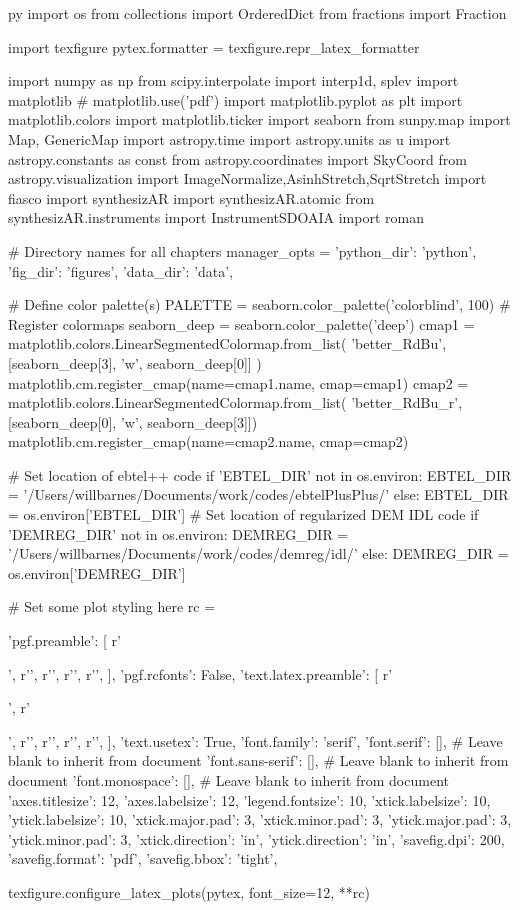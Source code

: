 \begin{pythontexcustomcode}{py}
import os
from collections import OrderedDict
from fractions import Fraction

import texfigure
pytex.formatter = texfigure.repr_latex_formatter

import numpy as np
from scipy.interpolate import interp1d, splev
import matplotlib
# matplotlib.use('pdf')
import matplotlib.pyplot as plt
import matplotlib.colors
import matplotlib.ticker
import seaborn
from sunpy.map import Map, GenericMap
import astropy.time
import astropy.units as u
import astropy.constants as const
from astropy.coordinates import SkyCoord
from astropy.visualization import ImageNormalize,AsinhStretch,SqrtStretch
import fiasco
import synthesizAR
import synthesizAR.atomic
from synthesizAR.instruments import InstrumentSDOAIA
import roman

# Directory names for all chapters
manager_opts = {'python_dir': 'python', 'fig_dir': 'figures', 'data_dir': 'data',}

# Define color palette(s)
PALETTE = seaborn.color_palette('colorblind', 100)
#  Register colormaps
seaborn_deep = seaborn.color_palette('deep')
cmap1 = matplotlib.colors.LinearSegmentedColormap.from_list(
    'better_RdBu', [seaborn_deep[3], 'w', seaborn_deep[0]]
)
matplotlib.cm.register_cmap(name=cmap1.name, cmap=cmap1)
cmap2 = matplotlib.colors.LinearSegmentedColormap.from_list(
    'better_RdBu_r', [seaborn_deep[0], 'w', seaborn_deep[3]])
matplotlib.cm.register_cmap(name=cmap2.name, cmap=cmap2)

# Set location of ebtel++ code
if 'EBTEL_DIR' not in os.environ:
	EBTEL_DIR = '/Users/willbarnes/Documents/work/codes/ebtelPlusPlus/'
else:
	EBTEL_DIR = os.environ['EBTEL_DIR']
# Set location of regularized DEM IDL code
if 'DEMREG_DIR' not in os.environ:
	DEMREG_DIR = '/Users/willbarnes/Documents/work/codes/demreg/idl/'
else:
	DEMREG_DIR = os.environ['DEMREG_DIR']

# Set some plot styling here
rc = {
	'pgf.preamble': [
		r'\usepackage{siunitx}',
		r'\DeclareSIUnit[number-unit-product={}]',
		r'\DeclareSIUnit[number-unit-product={}]',
		r'\DeclareSIUnit[number-unit-product={}]',
		r'\DeclareSIUnit[number-unit-product={}]',
	],
	'pgf.rcfonts': False,
	'text.latex.preamble': [
		r'\usepackage{mathpazo}',
		r'\usepackage{siunitx}',
		r'\DeclareSIUnit[number-unit-product={}]',
		r'\DeclareSIUnit[number-unit-product={}]',
		r'\DeclareSIUnit[number-unit-product={}]',
		r'\DeclareSIUnit[number-unit-product={}]',
	],
	'text.usetex': True,
	'font.family': 'serif',
	'font.serif': [], # Leave blank to inherit from document
	'font.sans-serif': [], # Leave blank to inherit from document
	'font.monospace': [], # Leave blank to inherit from document
	'axes.titlesize': 12,
	'axes.labelsize': 12,
	'legend.fontsize': 10,
	'xtick.labelsize': 10,
	'ytick.labelsize': 10,
	'xtick.major.pad': 3,
	'xtick.minor.pad': 3,
	'ytick.major.pad': 3,
	'ytick.minor.pad': 3,
	'xtick.direction': 'in',
	'ytick.direction': 'in',
	'savefig.dpi': 200,
	'savefig.format': 'pdf',
	'savefig.bbox': 'tight',
}
texfigure.configure_latex_plots(pytex, font_size=12, **rc)

\end{pythontexcustomcode}
